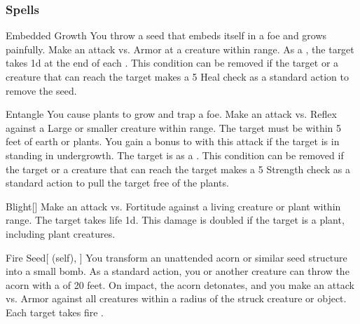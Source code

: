 \subsubsection{Spells}


\lowercase{\hypertarget{spell:Embedded Growth}{}}\label{spell:Embedded Growth}
\begin{ability}[\nth{1}]{\hypertarget{spell:Embedded Growth}{Embedded Growth}}
You throw a seed that embeds itself in a foe and grows painfully.
Make an attack vs. Armor at a creature within \rngclose range.
\hit As a , the target takes  \plus1d at the end of each .
This condition can be removed if the target or a creature that can reach the target makes a  5 Heal check as a standard action to remove the seed.
\end{ability}
\vspace{0.25em}



\lowercase{\hypertarget{spell:Entangle}{}}\label{spell:Entangle}
\begin{ability}[\nth{1}]{\hypertarget{spell:Entangle}{Entangle}}
You cause plants to grow and trap a foe.
Make an attack vs. Reflex against a Large or smaller creature within \rngmed range.
The target must be within 5 feet of earth or plants.
You gain a  bonus to  with this attack if the target is in standing in undergrowth.
\hit The target is  as a .
This condition can be removed if the target or a creature that can reach the target makes a  5 Strength check as a standard action to pull the target free of the plants.
\end{ability}
\vspace{0.25em}



\lowercase{\hypertarget{spell:Blight}{}}\label{spell:Blight}
\begin{ability}[\nth{2}]{\hypertarget{spell:Blight}{Blight}}[]
Make an attack vs. Fortitude against a living creature or plant within \rngmed range.
\hit The target takes life  \plus1d.
This damage is doubled if the target is a plant, including plant creatures.
\end{ability}
\vspace{0.25em}



\lowercase{\hypertarget{spell:Fire Seed}{}}\label{spell:Fire Seed}
\begin{ability}[\nth{2}]{\hypertarget{spell:Fire Seed}{Fire Seed}}[ (self), ]
You transform an unattended acorn or similar seed structure into a small bomb.
As a standard action, you or another creature can throw the acorn with a  of 20 feet.
On impact, the acorn detonates, and you make an attack vs. Armor against all creatures within a \areasmall radius of the struck creature or object.
\hit Each target takes fire .
\end{ability}
\vspace{0.25em}




